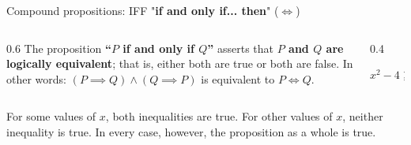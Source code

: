 \documentclass[11pt,aspectratio=1610]{beamer}
\begin{document}
\begin{frame}{Compound propositions: IFF "\textbf{if and only if... then}" ($\iff$) }
	
	\vspace{0mm}
\begin{columns}[t]
		
	\begin{column}[t]{0.6\textwidth}
			\p
	The proposition \textbf{“$P$ if and only if $Q$”} asserts that \textbf{$P$ and $Q$ are logically equivalent}; that is, either both are true or both are false. \p In other words: $(P\implies Q) \land (Q \implies P)$ is equivalent to $P\iff Q$.
	\p
	\end{column}
		
	\begin{column}[t]{0.4\textwidth}
	\vspace{-3mm}
	\begin{examplen}
	$x^2-4 \ge 0 \iff |x| \ge 2 $
	\end{examplen}
	
	\p
	
	
	
	\end{column}		
	\end{columns}
	\vspace{2mm}
	
For some values of $x$, both inequalities are true. For other values of $x$, neither inequality is true. In every case, however, the proposition as a whole is true.\vspace{0mm}
		\p
\begin{center}
	
\end{center}


	\end{frame}
	
\end{document}
